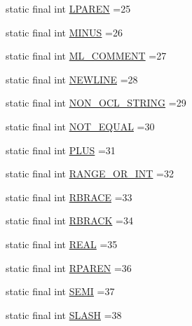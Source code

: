 \begin{DoxyCompactItemize}
\item 
static final int \hyperlink{classorg_1_1tzi_1_1use_1_1parser_1_1soil_1_1_soil_lexer_a535566acd69b10a3b8cd822b5505d756}{L\-P\-A\-R\-E\-N} =25
\item 
static final int \hyperlink{classorg_1_1tzi_1_1use_1_1parser_1_1soil_1_1_soil_lexer_a69823e5392f36eb0458c90fa396323d3}{M\-I\-N\-U\-S} =26
\item 
static final int \hyperlink{classorg_1_1tzi_1_1use_1_1parser_1_1soil_1_1_soil_lexer_a069d8cd12b84d63293a7549f16fc8d99}{M\-L\-\_\-\-C\-O\-M\-M\-E\-N\-T} =27
\item 
static final int \hyperlink{classorg_1_1tzi_1_1use_1_1parser_1_1soil_1_1_soil_lexer_a0480c7ecf2c3e5656da5c1e97c942510}{N\-E\-W\-L\-I\-N\-E} =28
\item 
static final int \hyperlink{classorg_1_1tzi_1_1use_1_1parser_1_1soil_1_1_soil_lexer_adf6d3be0c6b86af81d78967008d0701c}{N\-O\-N\-\_\-\-O\-C\-L\-\_\-\-S\-T\-R\-I\-N\-G} =29
\item 
static final int \hyperlink{classorg_1_1tzi_1_1use_1_1parser_1_1soil_1_1_soil_lexer_a937125aebaa726e5f72040c399767611}{N\-O\-T\-\_\-\-E\-Q\-U\-A\-L} =30
\item 
static final int \hyperlink{classorg_1_1tzi_1_1use_1_1parser_1_1soil_1_1_soil_lexer_ac2b5d5a82739059bc74326d12c80cf0a}{P\-L\-U\-S} =31
\item 
static final int \hyperlink{classorg_1_1tzi_1_1use_1_1parser_1_1soil_1_1_soil_lexer_a96e40f8ed3bb8b7d0082fc4f8c1040ef}{R\-A\-N\-G\-E\-\_\-\-O\-R\-\_\-\-I\-N\-T} =32
\item 
static final int \hyperlink{classorg_1_1tzi_1_1use_1_1parser_1_1soil_1_1_soil_lexer_a504921def77feedb41cf01661476cfb2}{R\-B\-R\-A\-C\-E} =33
\item 
static final int \hyperlink{classorg_1_1tzi_1_1use_1_1parser_1_1soil_1_1_soil_lexer_a27cbfe89d5c00dffb7d49dad4c1118ff}{R\-B\-R\-A\-C\-K} =34
\item 
static final int \hyperlink{classorg_1_1tzi_1_1use_1_1parser_1_1soil_1_1_soil_lexer_afccc0874e991e9f226507232a1577100}{R\-E\-A\-L} =35
\item 
static final int \hyperlink{classorg_1_1tzi_1_1use_1_1parser_1_1soil_1_1_soil_lexer_a0789364a25aa234d52077edaf6c884c8}{R\-P\-A\-R\-E\-N} =36
\item 
static final int \hyperlink{classorg_1_1tzi_1_1use_1_1parser_1_1soil_1_1_soil_lexer_a8d9772c53fb99cdeb21b0ead62b9c125}{S\-E\-M\-I} =37
\item 
static final int \hyperlink{classorg_1_1tzi_1_1use_1_1parser_1_1soil_1_1_soil_lexer_aaa2ca1c8eac8b3f52ea2a1fdf4302e5e}{S\-L\-A\-S\-H} =38

\end{DoxyCompactItemize}
